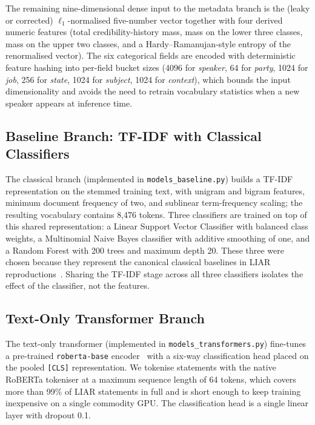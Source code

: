 \documentclass[journal]{IEEEtran}
\begin{document}
The remaining nine-dimensional dense input to the metadata branch is the (leaky or corrected) $\ell_1$-normalised five-number vector together with four derived numeric features (total credibility-history mass, mass on the lower three classes, mass on the upper two classes, and a Hardy--Ramanujan-style entropy of the renormalised vector). The six categorical fields are encoded with deterministic feature hashing into per-field bucket sizes (4096 for \emph{speaker}, 64 for \emph{party}, 1024 for \emph{job}, 256 for \emph{state}, 1024 for \emph{subject}, 1024 for \emph{context}), which bounds the input dimensionality and avoids the need to retrain vocabulary statistics when a new speaker appears at inference time.

\subsection{Baseline Branch: TF-IDF with Classical Classifiers}
The classical branch (implemented in \texttt{models\_baseline.py}) builds a TF-IDF representation on the stemmed training text, with unigram and bigram features, minimum document frequency of two, and sublinear term-frequency scaling; the resulting vocabulary contains 8{,}476 tokens. Three classifiers are trained on top of this shared representation: a Linear Support Vector Classifier with balanced class weights, a Multinomial Naive Bayes classifier with additive smoothing of one, and a Random Forest with 200 trees and maximum depth 20. These three were chosen because they represent the canonical classical baselines in LIAR reproductions~\cite{khanam2021,sanahmed2023,irawan2025}. Sharing the TF-IDF stage across all three classifiers isolates the effect of the classifier, not the features.

\subsection{Text-Only Transformer Branch}
The text-only transformer (implemented in \texttt{models\_transformers.py}) fine-tunes a pre-trained \texttt{roberta-base} encoder~\cite{devlin2019bert} with a six-way classification head placed on the pooled \texttt{[CLS]} representation. We tokenise statements with the native RoBERTa tokeniser at a maximum sequence length of 64 tokens, which covers more than 99\% of LIAR statements in full and is short enough to keep training inexpensive on a single commodity GPU. The classification head is a single linear layer with dropout 0.1.
\end{document}
